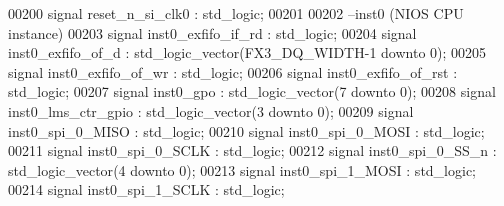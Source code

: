 \begin{DoxyCode}
00200 \textcolor{keywordflow}{signal} \textcolor{vhdlchar}{reset_n_si_clk0}           \textcolor{vhdlchar}{:} \textcolor{comment}{std\_logic};
00201 
00202 \textcolor{keyword}{--inst0 (NIOS CPU instance)}
00203 \textcolor{keywordflow}{signal} \textcolor{vhdlchar}{inst0_exfifo_if_rd}        \textcolor{vhdlchar}{:} \textcolor{comment}{std\_logic};
00204 \textcolor{keywordflow}{signal} \textcolor{vhdlchar}{inst0_exfifo_of_d}         \textcolor{vhdlchar}{:} \textcolor{comment}{std\_logic\_vector}\textcolor{vhdlchar}{(}\textcolor{vhdlchar}{FX3_DQ_WIDTH}\textcolor{vhdlchar}{-}\textcolor{vhdllogic}{}\textcolor{vhdllogic}{1} \textcolor{keywordflow}{downto} \textcolor{vhdllogic}{}\textcolor{vhdllogic}{0}\textcolor{vhdlchar}{)};
00205 \textcolor{keywordflow}{signal} \textcolor{vhdlchar}{inst0_exfifo_of_wr}        \textcolor{vhdlchar}{:} \textcolor{comment}{std\_logic};
00206 \textcolor{keywordflow}{signal} \textcolor{vhdlchar}{inst0_exfifo_of_rst}          \textcolor{vhdlchar}{:} \textcolor{comment}{std\_logic};
00207 \textcolor{keywordflow}{signal} \textcolor{vhdlchar}{inst0_gpo}                \textcolor{vhdlchar}{:} \textcolor{comment}{std\_logic\_vector}\textcolor{vhdlchar}{(}\textcolor{vhdllogic}{}\textcolor{vhdllogic}{7} \textcolor{keywordflow}{downto} \textcolor{vhdllogic}{}\textcolor{vhdllogic}{0}\textcolor{vhdlchar}{)};
00208 \textcolor{keywordflow}{signal} \textcolor{vhdlchar}{inst0_lms_ctr_gpio}        \textcolor{vhdlchar}{:} \textcolor{comment}{std\_logic\_vector}\textcolor{vhdlchar}{(}\textcolor{vhdllogic}{}\textcolor{vhdllogic}{3} \textcolor{keywordflow}{downto} \textcolor{vhdllogic}{}\textcolor{vhdllogic}{0}\textcolor{vhdlchar}{)};
00209 \textcolor{keywordflow}{signal} \textcolor{vhdlchar}{inst0_spi_0_MISO}          \textcolor{vhdlchar}{:} \textcolor{comment}{std\_logic};
00210 \textcolor{keywordflow}{signal} \textcolor{vhdlchar}{inst0_spi_0_MOSI}          \textcolor{vhdlchar}{:} \textcolor{comment}{std\_logic};
00211 \textcolor{keywordflow}{signal} \textcolor{vhdlchar}{inst0_spi_0_SCLK}          \textcolor{vhdlchar}{:} \textcolor{comment}{std\_logic};
00212 \textcolor{keywordflow}{signal} \textcolor{vhdlchar}{inst0_spi_0_SS_n}          \textcolor{vhdlchar}{:} \textcolor{comment}{std\_logic\_vector}\textcolor{vhdlchar}{(}\textcolor{vhdllogic}{}\textcolor{vhdllogic}{4} \textcolor{keywordflow}{downto} \textcolor{vhdllogic}{}\textcolor{vhdllogic}{0}\textcolor{vhdlchar}{)};
00213 \textcolor{keywordflow}{signal} \textcolor{vhdlchar}{inst0_spi_1_MOSI}          \textcolor{vhdlchar}{:} \textcolor{comment}{std\_logic};
00214 \textcolor{keywordflow}{signal} \textcolor{vhdlchar}{inst0_spi_1_SCLK}          \textcolor{vhdlchar}{:} \textcolor{comment}{std\_logic};

\end{DoxyCode}
